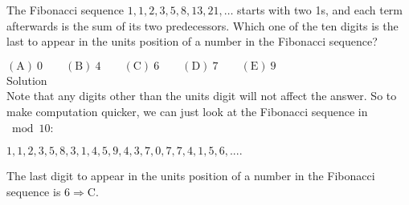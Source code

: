 
The Fibonacci sequence $1,1,2,3,5,8,13,21,\ldots$ starts with two 1s, and each term afterwards is the sum of its two predecessors. Which one of the ten digits is the last to appear in the units position of a number in the Fibonacci sequence?

$\mathrm{(A) \ 0 } \qquad \mathrm{(B) \ 4 } \qquad \mathrm{(C) \ 6 } \qquad \mathrm{(D) \ 7 } \qquad \mathrm{(E) \ 9 }$
\\
Solution
\\
Note that any digits other than the units digit will not affect the answer. So to make computation quicker, we can just look at the Fibonacci sequence in $\bmod{10}$:

$1,1,2,3,5,8,3,1,4,5,9,4,3,7,0,7,7,4,1,5,6,....$

The last digit to appear in the units position of a number in the Fibonacci sequence is $6 \Longrightarrow \boxed{\mathrm{C}}$.

